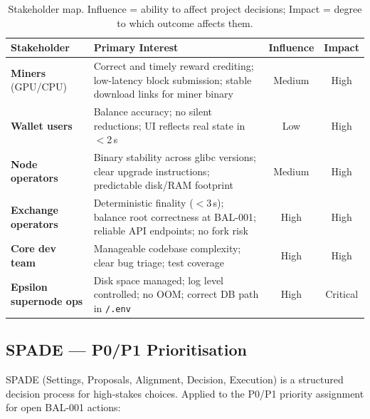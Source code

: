 \documentclass[12pt,a4paper]{article}
\begin{document}
\begin{table}[H]
\centering
\small
\renewcommand{\arraystretch}{1.3}
\begin{tabularx}{\linewidth}{lXcc}
\toprule
\textbf{Stakeholder} & \textbf{Primary Interest} & \textbf{Influence} & \textbf{Impact} \\
\midrule
\textbf{Miners} (GPU/CPU) &
  Correct and timely reward crediting; low-latency block submission;
  stable download links for miner binary &
  Medium & High \\
\rowcolor{rowgray}
\textbf{Wallet users} &
  Balance accuracy; no silent reductions; UI reflects real state in $<$2\,s &
  Low & High \\
\textbf{Node operators} &
  Binary stability across glibc versions; clear upgrade instructions;
  predictable disk/RAM footprint &
  Medium & High \\
\rowcolor{rowgray}
\textbf{Exchange operators} &
  Deterministic finality ($<$3\,s); balance root correctness at BAL-001;
  reliable API endpoints; no fork risk &
  High & High \\
\textbf{Core dev team} &
  Manageable codebase complexity; clear bug triage; test coverage &
  High & High \\
\rowcolor{rowgray}
\textbf{Epsilon supernode ops} &
  Disk space managed; log level controlled; no OOM;
  correct DB path in \texttt{/.env} &
  High & Critical \\
\bottomrule
\end{tabularx}
\caption{Stakeholder map. Influence = ability to affect project decisions;
  Impact = degree to which outcome affects them.}
\end{table}

\subsection{SPADE --- P0/P1 Prioritisation}

SPADE (Settings, Proposals, Alignment, Decision, Execution) is a structured
decision process for high-stakes choices. Applied to the P0/P1 priority
assignment for open BAL-001 actions:
\end{document}
